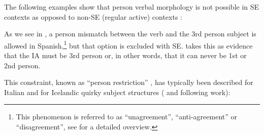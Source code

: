 \documentclass[output=paper,colorlinks,citecolor=brown]{langscibook}
\begin{document}
The following examples show that person verbal morphology is not possible in SE contexts  as opposed to non-SE (regular active) contexts :

\ea \label{ex:05:SEperson} \citet[127]{Lopez2007}
\label{ex:05:SEpersona}
\label{ex:05:SEpersonb}
\z \z

As we see in , a person mismatch between the verb and the 3rd person subject is allowed in Spanish,\footnote{This phenomenon is referred to as ``unagreement'', ``anti-agreement'' or ``disagreement'', see \citet{Hohn2015} for a detailed overview.} but that option is excluded with SE. \cite{Lopez2007} takes this as evidence that the IA must be 3rd person or, in other words, that it can never be 1st or 2nd person.

This constraint, known as ``person restriction'' \citep{Burzio1986}, has typically been  described for Italian \citep{DAlessandro2007, Pescarini2018} and for Icelandic quirky subject structures (\citealt{Sigurdsson1992} and following work):

\ea \label{ex:05:PRIT} \citet[89]{DAlessandro2007}
\label{ex:05:PRITa}
\label{ex:05:PRITb}
\z \z

\newpage
\ea \label{ex:05:PRICEL} \citet[254]{Sirg_Holm2008}
\label{ex:05:PRICELa}
\label{ex:05:PRICELb}
\z \z
\end{document}
